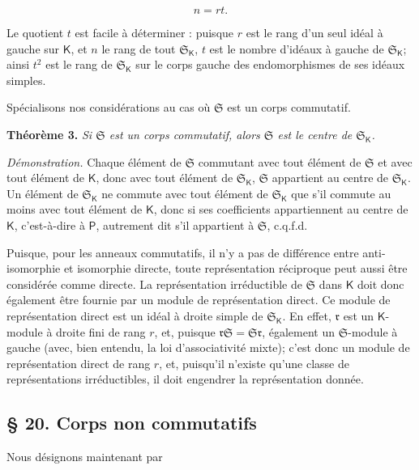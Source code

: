 \[
n=rt.
\]

Le quotient \(t\) est facile à déterminer : puisque \(r\) est le rang d'un seul idéal à gauche sur \(\mathsf K\), et \(n\) le rang de tout \(\mathfrak S_{\mathsf K}\), \(t\) est le nombre d'idéaux à gauche de \(\mathfrak S_{\mathsf K}\); ainsi \(t^2\) est le rang de \(\mathfrak S_{\mathsf K}\) sur le corps gauche des endomorphismes de ses idéaux simples.

Spécialisons nos considérations au cas où \(\mathfrak S\) est un corps commutatif.

\textbf{Théorème 3.} \emph{Si \(\mathfrak S\) est un corps commutatif, alors \(\mathfrak S\) est le centre de \(\mathfrak S_{\mathsf K}\).}

\emph{Démonstration.} Chaque élément de \(\mathfrak S\) commutant avec tout élément de \(\mathfrak S\) et avec tout élément de \(\mathsf K\), donc avec tout élément de \(\mathfrak S_{\mathsf K}\), \(\mathfrak S\) appartient au centre de \(\mathfrak S_{\mathsf K}\). Un élément de \(\mathfrak S_{\mathsf K}\) ne commute avec tout élément de \(\mathfrak S_{\mathsf K}\) que s'il commute au moins avec tout élément de \(\mathsf K\), donc si ses coefficients appartiennent au centre de \(\mathsf K\), c'est-à-dire à \(\mathsf P\), autrement dit s'il appartient à \(\mathfrak S\), c.q.f.d.

Puisque, pour les anneaux commutatifs, il n'y a pas de différence entre anti-isomorphie et isomorphie directe, toute représentation réciproque peut aussi être considérée comme directe. La représentation irréductible de \(\mathfrak S\) dans \(\mathsf K\) doit donc également être fournie par un module de représentation direct. Ce module de représentation direct est un idéal à droite simple de \(\mathfrak S_{\mathsf K}\). En effet, \(\mathfrak r\) est un \(\mathsf K\)-module à droite fini de rang \(r\), et, puisque \(\mathfrak r\mathfrak S=\mathfrak S\mathfrak r\), également un \(\mathfrak S\)-module à gauche (avec, bien entendu, la loi d'associativité mixte); c'est donc un module de représentation direct de rang \(r\), et, puisqu'il n'existe qu'une classe de représentations irréductibles, il doit engendrer la représentation donnée.

\subsection*{\S{} 20. Corps non commutatifs}\label{fr-r823-corps-non-commutatifs}

Nous désignons maintenant par

